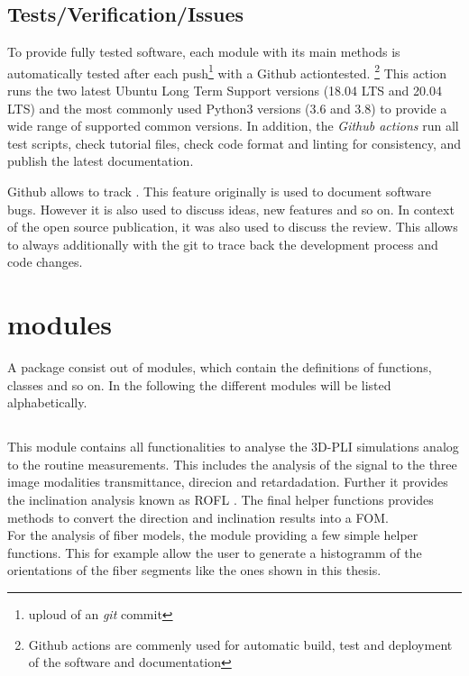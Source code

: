 \subsection{Tests/Verification/Issues}
% 
To provide fully tested software, each module with its main methods is automatically tested after each push\footnote{uploud of an \textit{git} commit} with a Github actiontested. \footnote{Github actions are commenly used for automatic build, test and deployment of the software and documentation} 
This action runs the two latest Ubuntu Long Term Support versions (18.04 LTS and 20.04 LTS) and the most commonly used Python3 versions (3.6 and 3.8) to provide a wide range of supported common versions.
In addition, the \textit{Github actions} run all test scripts, check tutorial files, check code format and linting for consistency, and publish the latest documentation.
% 
\par
% 
Github allows to track .
This feature originally is used to document software bugs.
However it is also used to discuss ideas, new features and so on.
In context of the open source publication, it was also used to discuss the review.
This allows to always additionally with the git  to trace back the development process and code changes.
%
%  
% 
%  
\section{modules}
% 
A \python{} package consist out of modules, which contain the definitions of functions, classes and so on.
In the following the different modules will be listed alphabetically.
% 
% 
% 
\subsection{}
% 
This module contains all functionalities to analyse the \ac{3D-PLI} simulations analog to the routine measurements.
This includes the analysis of the signal to the three image modalities transmittance, direcion and retardadation.
Further it provides the inclination analysis known as \ac{ROFL} \cite{Schmitz2018}.
The final helper functions provides methods to convert the direction and inclination results into a \ac{FOM}.
\\
For the analysis of fiber models, the module providing a few simple helper functions.
This for example allow the user to generate a histogramm of the orientations of the fiber segments like the ones shown in this thesis.
% 
